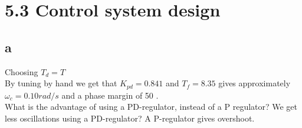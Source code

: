 \section{5.3 Control system design}
\subsection{a}
Choosing $T_d=T$\\
By tuning by hand we get that $K_{pd} = 0.841$ and $T_f = 8.35$ gives approximately $\omega_c = 0.10 rad/s$ and a phase margin of 50 \deg.\\
What is the advantage of using a PD-regulator, instead of a P regulator? We get less oscillations using a PD-regulator? 
A P-regulator gives overshoot. 
